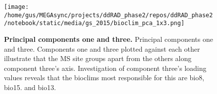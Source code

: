 \documentclass[letterpaper]{scrartcl}
\begin{document}
\begin{figure}[htbp]
\centering
\texttt{[image: /home/gus/MEGAsync/projects/ddRAD\_phase2/repos/ddRAD\_phase2/notebook/static/media/gs\_2015/bioclim\_pca\_1x3.png]}
\caption{\textbf{Principal components one and three.} Principal
components one and three. Components one and three plotted against each
other illustrate that the MS site groups apart from the others along
component three's axis. Investigation of component three's loading
values reveals that the bioclims most responsible for this are bio8,
bio15. and bio13.}
\end{figure}
\end{document}
